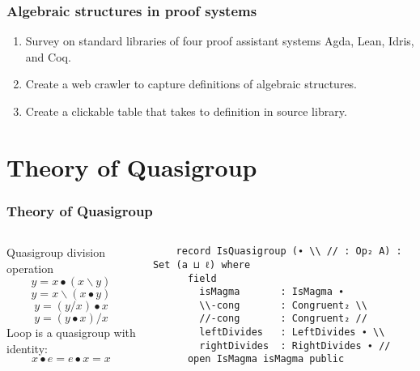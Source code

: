\documentclass[xcolor={dvipsnames}]{beamer}
\begin{document}
\begin{frame}
  \frametitle{Algebraic structures in proof systems}
  \begin{enumerate}
    \item Survey on standard libraries of four proof assistant systems Agda, Lean, Idris, and Coq.
    \item Create a web crawler to capture definitions of algebraic structures.
    \item Create a clickable table that takes to definition in source library.
  \end{enumerate}

\end{frame}

\section{Theory of Quasigroup}

\begin{frame}[fragile]
  \frametitle{Theory of Quasigroup}  
  \begin{columns}
    \begin{column}{0.4\textwidth}
        Quasigroup division operation
            \[y=x∙(x\backslash y)\]
            \[y=x\backslash(x∙y)\]
            \[y=(y/x)∙x\]
            \[y=(y∙x)/x\]
      Loop is a quasigroup with identity:
      \[x∙e=e∙x=x\]
    \end{column}
    \hfill
    \begin{column}{0.575\textwidth}
\begin{verbatim}
    record IsQuasigroup (∙ \\ // : Op₂ A) : Set (a ⊔ ℓ) where
      field
        isMagma       : IsMagma ∙
        \\-cong       : Congruent₂ \\
        //-cong       : Congruent₂ //
        leftDivides   : LeftDivides ∙ \\
        rightDivides  : RightDivides ∙ //
      open IsMagma isMagma public
\end{verbatim}
    \end{column}
  \end{columns}
\end{frame}
\end{document}
